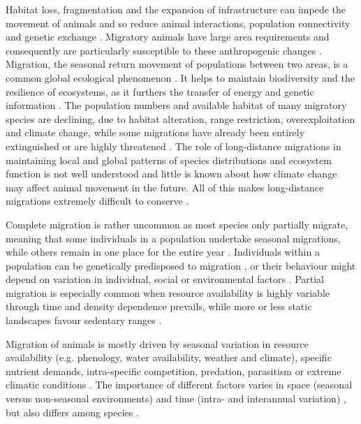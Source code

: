 \documentclass[12pt,a4paper, twoside, english]{article}
\begin{document}
Habitat loss, fragmentation and the expansion of infrastructure can impede the movement of animals and so reduce animal interactions, population connectivity and genetic exchange \citep{Fischer2007, Kaczensky2011, Zeller2012, Tracey2013}. Migratory animals have large area requirements and consequently are particularly susceptible to these anthropogenic changes \citep{Berger2004, Bolger2008, Wilcove2008}. Migration, the seasonal return movement of populations between two areas, is a common global ecological phenomenon \citep{Dingle2007, Alerstam2003, Bolger2008, Teitelbaum2015}. It helps to maintain biodiversity and the resilience of ecosystems, as it furthers the transfer of energy and genetic information \citep{Jeltsch2013, Pettorelli2014, Bauer2014}. The population numbers and available habitat of many migratory species are declining, due to habitat alteration, range restriction, overexploitation and climate change, while some migrations have already been entirely extinguished or are highly threatened \citep{Fryxell1988, Serneels2001a, Bolger2008, Berger2004, Wilcove2008, Harris2009}. 
The role of long-distance migrations in maintaining local and global patterns of species distributions and ecosystem function is not well understood \citep{Jeltsch2013} and little is known about how climate change may affect animal movement in the future. All of this makes long-distance migrations extremely difficult to conserve \citep{Wilcove2008}.

Complete migration is rather uncommon as most species only partially migrate, meaning that some individuals in a population undertake seasonal migrations, while others remain in one place for the entire year \citep{Dingle2007, Chapman2011}. Individuals within a population can be genetically predisposed to migration \citep{Berthold1981}, or their behaviour might depend on variation in individual, social or environmental factors \citep{White2007a, Barton2015}. Partial migration is especially common when resource availability is highly variable through time and density dependence prevails, while more or less static landscapes favour sedentary ranges \citep{Taylor2007b, Mueller2008, Mueller2011, Boettiger2015}.

Migration of animals is mostly driven by seasonal variation in resource availability (e.g. phenology, water availability, weather and climate), specific nutrient demands, intra-specific competition, predation, parasitism or extreme climatic conditions \citep{Fryxell1988, Alerstam2003, Bolger2008}. The importance of different factors varies in space (seasonal versus non-seasonal environments) \citep{DeKnegt2011} and time (intra- and interannual variation) \citep{Boone2006}, but also differs among species \citep{Singh2010}. 
\end{document}
